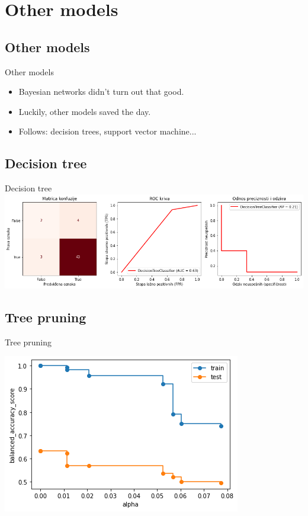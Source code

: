 \documentclass[hyperref={bookmarks=false}]{beamer}
\begin{document}
\section{Other models}
\subsection{Other models}
\begin{frame}{Other models}
\begin{itemize}
    \item Bayesian networks didn't turn out that good.
    \item Luckily, other models saved the day.
    \item Follows: decision trees, support vector machine...
\end{itemize}
\end{frame}

\subsection{Decision tree}
\begin{frame}{Decision tree}
\includegraphics[width=\textwidth]{tree.png}
\end{frame}

\subsection{Tree pruning}
\begin{frame}{Tree pruning}
\begin{center}
    \includegraphics[width=.75\textwidth]{pruning.png}
\end{center}
\end{frame}
\end{document}
